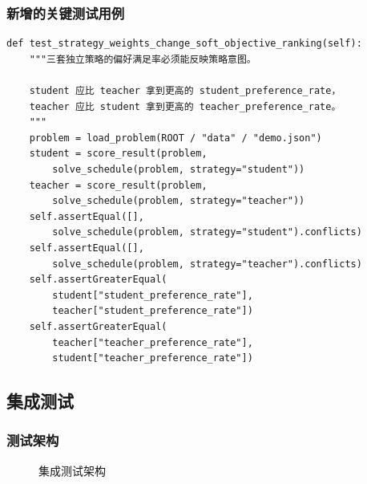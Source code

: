 \subsubsection{新增的关键测试用例}

\begin{lstlisting}[style=cmplain]
def test_strategy_weights_change_soft_objective_ranking(self):
    """三套独立策略的偏好满足率必须能反映策略意图。

    student 应比 teacher 拿到更高的 student_preference_rate，
    teacher 应比 student 拿到更高的 teacher_preference_rate。
    """
    problem = load_problem(ROOT / "data" / "demo.json")
    student = score_result(problem,
        solve_schedule(problem, strategy="student"))
    teacher = score_result(problem,
        solve_schedule(problem, strategy="teacher"))
    self.assertEqual([],
        solve_schedule(problem, strategy="student").conflicts)
    self.assertEqual([],
        solve_schedule(problem, strategy="teacher").conflicts)
    self.assertGreaterEqual(
        student["student_preference_rate"],
        teacher["student_preference_rate"])
    self.assertGreaterEqual(
        teacher["teacher_preference_rate"],
        student["teacher_preference_rate"])
\end{lstlisting}

\subsection{集成测试}

\subsubsection{测试架构}

\begin{figure}[h]
\centering
{}
\caption{集成测试架构}
\label{fig:test-arch}
\end{figure}

